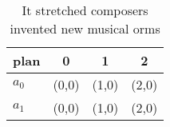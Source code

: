 \documentclass[a4paper]{article}
\begin{document}
\begin{table}
\begin{adjustbox}{width=0.5\columnwidth}
\begin{tabular}{|l|l|l|l|}
\hline
\textbf{plan} & \multicolumn{1}{c|}{\textbf{0}} & \multicolumn{1}{c|}{\textbf{1}} & \multicolumn{1}{c|}{\textbf{2}} \\ \hline
\textbf{$a_0$}  & (0,0) & (1,0) & (2,0) \\ \hline
\textbf{$a_1$}  & (0,0) & (1,0) & (2,0) \\ \hline
\end{tabular}
\end{adjustbox}
\caption{It stretched composers invented new musical orms 
}
\end{table}
\end{document}
